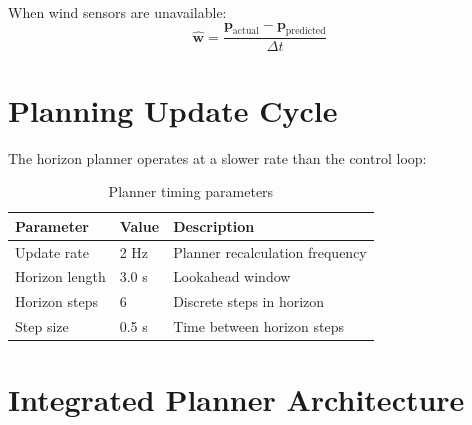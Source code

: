 When wind sensors are unavailable:
\begin{equation}
    \hat{\mathbf{w}} = \frac{\mathbf{p}_{\text{actual}} - \mathbf{p}_{\text{predicted}}}{\Delta t}
\end{equation}


\section{Planning Update Cycle}

The horizon planner operates at a slower rate than the control loop:

\begin{table}[htbp]
    \centering
    \caption{Planner timing parameters}
    \label{tab:planner_timing}
    \begin{tabular}{@{}lll@{}}
        \toprule
        \textbf{Parameter} & \textbf{Value} & \textbf{Description} \\
        \midrule
        Update rate & 2 Hz & Planner recalculation frequency \\
        Horizon length & 3.0 s & Lookahead window \\
        Horizon steps & 6 & Discrete steps in horizon \\
        Step size & 0.5 s & Time between horizon steps \\
        \bottomrule
    \end{tabular}
\end{table}

\section{Integrated Planner Architecture}


